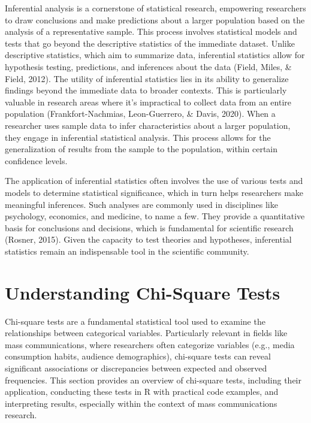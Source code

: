 \documentclass[
]{book}
\begin{document}
Inferential analysis is a cornerstone of statistical research, empowering researchers to draw conclusions and make predictions about a larger population based on the analysis of a representative sample. This process involves statistical models and tests that go beyond the descriptive statistics of the immediate dataset. Unlike descriptive statistics, which aim to summarize data, inferential statistics allow for hypothesis testing, predictions, and inferences about the data (Field, Miles, \& Field, 2012). The utility of inferential statistics lies in its ability to generalize findings beyond the immediate data to broader contexts. This is particularly valuable in research areas where it's impractical to collect data from an entire population (Frankfort-Nachmias, Leon-Guerrero, \& Davis, 2020). When a researcher uses sample data to infer characteristics about a larger population, they engage in inferential statistical analysis. This process allows for the generalization of results from the sample to the population, within certain confidence levels.

The application of inferential statistics often involves the use of various tests and models to determine statistical significance, which in turn helps researchers make meaningful inferences. Such analyses are commonly used in disciplines like psychology, economics, and medicine, to name a few. They provide a quantitative basis for conclusions and decisions, which is fundamental for scientific research (Rosner, 2015). Given the capacity to test theories and hypotheses, inferential statistics remain an indispensable tool in the scientific community.

\section{Understanding Chi-Square Tests}\label{understanding-chi-square-tests}

Chi-square tests are a fundamental statistical tool used to examine the relationships between categorical variables. Particularly relevant in fields like mass communications, where researchers often categorize variables (e.g., media consumption habits, audience demographics), chi-square tests can reveal significant associations or discrepancies between expected and observed frequencies. This section provides an overview of chi-square tests, including their application, conducting these tests in R with practical code examples, and interpreting results, especially within the context of mass communications research.
\end{document}
